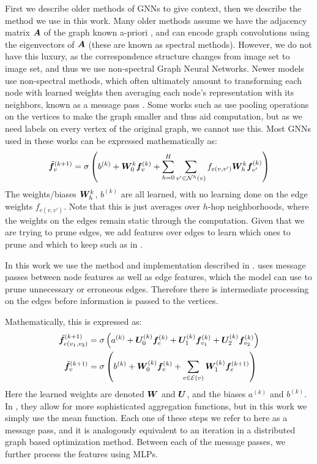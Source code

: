 \documentclass{article} %
\begin{document}
First we describe older methods of GNNs to give context, then we describe the method we use in this work.
Many older methods assume we have the adjacency matrix ${\bm{A}}$ of the graph known a-priori \cite{bruna2013spectral}, and can encode graph convolutions using the eigenvectors of ${\bm{A}}$ (these are known as spectral methods).
However, we do not have this luxury, as the correspondence structure changes from image set to image set, and thus we use non-spectral Graph Neural Networks.
Newer models use non-spectral methods, which often ultimately amount to transforming each node with learned weights then averaging each node's representation with its neighbors, known as a message pass \citep{kipf2017semi, defferrard2016convolutional, gama2018mimo, gama2018convolutional}.
Some works such as \cite{gama2019convolutional} use pooling operations on the vertices to make the graph smaller and thus aid computation, but as we need labels on every vertex of the original graph, we cannot use this.
Most GNNs used in these works can be expressed mathematically as:
\begin{align*}
\tilde{{\bm{f}}}_v^{(k+1)} =&\; \sigma\left( b^{(k)} + {\bm{W}}_0^{k} {\bm{f}}_{v}^{(k)} + \sum_{h=0}^H \sum_{v' \in \mathcal{N}^{h}(v)} f_{e(v,v')} {\bm{W}}_{h}^{k} {\bm{f}}_{v'}^{(k)} \right) \\
\end{align*}
The weights/biases ${\bm{W}}_{h}^{k}$, $b^{(k)}$ are all learned, with no learning done on the edge weights $f_{e(v,v')}$. 
Note that this is just averages over $h$-hop neighborhoods, where the weights on the edges remain static through the computation.
Given that we are trying to prune edges, we add features over edges to learn which ones to prune and which to keep such as in \cite{scarselli2009graph}.

In this work we use the method and implementation described in \cite{battaglia2018relational}.
\cite{battaglia2018relational} uses message passes between node features as well as edge features, which the model can use to prune unnecessary or erroneous edges.
Therefore there is intermediate processing on the edges before information is passed to the vertices. 

Mathematically, this is expressed as: %
\begin{align}
\tilde{{\bm{f}}}_{e(v_1,v_2)}^{(k+1)} =&\; \sigma \left(a^{(k)} + {\bm{U}}_0^{(k)} {\bm{f}}_{e}^{(k)} + {\bm{U}}_1^{(k)} {\bm{f}}_{v_1}^{(k)} + {\bm{U}}_2^{(k)} {\bm{f}}_{v_2}^{(k)} \right) \\
\tilde{{\bm{f}}}_{v}^{(k+1)} =&\; \sigma\left(b^{(k)} + {\bm{W}}_0^{(k)} {\bm{f}}_{v}^{(k)} + \sum_{e \in \mathcal{E}(v)} {\bm{W}}_1^{(k)} {\bm{f}}_{e}^{(k+1)} \right) 
\end{align}
Here the learned weights are denoted ${\bm{W}}$ and ${\bm{U}}$, and the biases $a^{(k)}$ and  $b^{(k)}$.
In \cite{battaglia2018relational}, they allow for more sophisticated aggregation functions, but in this work we simply use the mean function.
Each one of these steps we refer to here as a message pass, and it is analogously equivalent to an iteration in a distributed graph based optimization method.
Between each of the message passes, we further process the features using MLPs.
\end{document}
